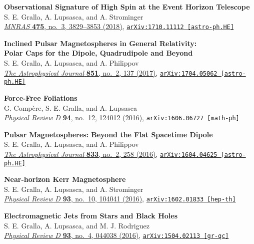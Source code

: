 \documentclass[margin,line]{resume}
\begin{document}
\begin{resume}
\textbf{Observational Signature of High Spin at the Event Horizon Telescope} \\
S. E. Gralla, A. Lupsasca, and A. Strominger \\
\href{https://doi.org/10.1093/mnras/sty039}{\textit{MNRAS} \textbf{475}, no.~3, 3829--3853 (2018)}, \texttt{\href{https://arxiv.org/abs/arXiv:1710.11112}{arXiv:1710.11112 [astro-ph.HE]}}

\textbf{Inclined Pulsar Magnetospheres in General Relativity:\\ Polar Caps for the Dipole, Quadrudipole and Beyond} \\
S. E. Gralla, A. Lupsasca, and A. Philippov \\
\href{https://doi.org/10.3847/1538-4357/aa978d}{\textit{The Astrophysical Journal} \textbf{851}, no.~2, 137 (2017)}, \texttt{\href{https://arxiv.org/abs/arXiv:1704.05062}{arXiv:1704.05062 [astro-ph.HE]}}

\textbf{Force-Free Foliations} \\
G. Comp\`ere, S. E. Gralla, and A. Lupsasca \\
\href{https://doi.org/10.1103/PhysRevD.94.124012}{\textit{Physical Review D} \textbf{94}, no.~12, 124012 (2016)}, \texttt{\href{https://arxiv.org/abs/arXiv:1606.06727}{arXiv:1606.06727 [math-ph]}}

\textbf{Pulsar Magnetospheres: Beyond the Flat Spacetime Dipole} \\
S. E. Gralla, A. Lupsasca, and A. Philippov \\
\href{https://doi.org/10.3847/1538-4357/833/2/258}{\textit{The Astrophysical Journal} \textbf{833}, no.~2, 258 (2016)}, \texttt{\href{https://arxiv.org/abs/arXiv:1604.04625}{arXiv:1604.04625 [astro-ph.HE]}}

\textbf{Near-horizon Kerr Magnetosphere} \\
S. E. Gralla, A. Lupsasca, and A. Strominger \\
\href{https://doi.org/10.1103/PhysRevD.93.104041}{\textit{Physical Review D} \textbf{93}, no.~10, 104041 (2016)}, \texttt{\href{https://arxiv.org/abs/arXiv:1602.01833}{arXiv:1602.01833 [hep-th]}}

\textbf{Electromagnetic Jets from Stars and Black Holes} \\
S. E. Gralla, A. Lupsasca, and M. J. Rodriguez \\
\href{https://doi.org/10.1103/PhysRevD.93.044038}{\textit{Physical Review D} \textbf{93}, no.~4, 044038 (2016)}, \texttt{\href{https://arxiv.org/abs/arXiv:1504.02113}{arXiv:1504.02113 [gr-qc]}}


\end{resume}
\end{document}
